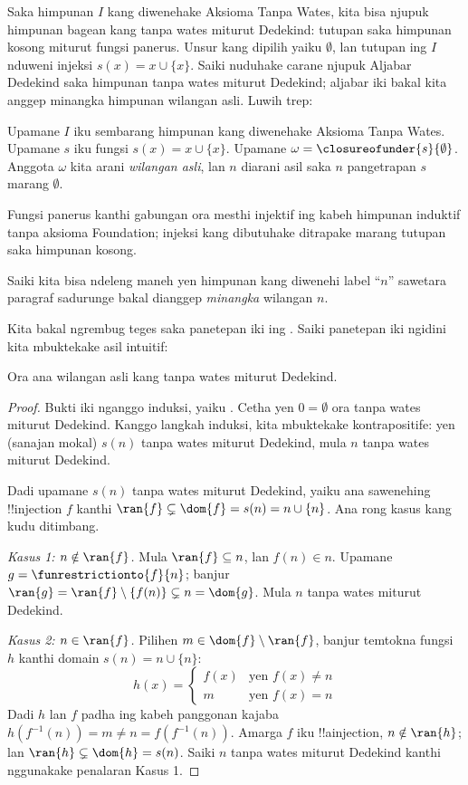 \documentclass[../../../include/open-logic-section]{subfiles}
\begin{document}
Saka himpunan $I$ kang diwenehake Aksioma Tanpa Wates,
kita bisa njupuk himpunan bagean kang tanpa wates miturut
Dedekind: tutupan saka himpunan kosong miturut fungsi panerus.
Unsur kang dipilih yaiku $\emptyset$, lan tutupan ing
$I$ nduweni injeksi $s(x) = x\cup \{x\}$.
Saiki 
nuduhake carane njupuk Aljabar Dedekind saka himpunan
tanpa wates miturut Dedekind; aljabar iki bakal kita
anggep minangka himpunan wilangan asli. Luwih trep:
\begin{defn}
Upamane $I$ iku sembarang himpunan kang diwenehake Aksioma
Tanpa Wates. Upamane $s$ iku fungsi $s(x) = x \cup \{x\}$.
Upamane $\omega = \closureofunder{s}{\emptyset}$. Anggota
$\omega$ kita arani \emph{wilangan asli}, lan $n$ diarani
asil saka $n$ pangetrapan $s$ marang $\emptyset$.
\end{defn}
Fungsi panerus kanthi gabungan ora mesthi injektif ing kabeh himpunan induktif tanpa aksioma Foundation; injeksi kang dibutuhake ditrapake marang tutupan saka himpunan kosong.

Saiki kita bisa ndeleng maneh yen himpunan kang diwenehi
label ``$n$'' sawetara paragraf sadurunge bakal dianggep
\emph{minangka} wilangan $n$.

Kita bakal ngrembug teges saka panetepan iki ing
. Saiki panetepan iki ngidini
kita mbuktekake asil intuitif:

\begin{prop}
Ora ana wilangan asli kang tanpa wates miturut Dedekind.
\end{prop}

\begin{proof}
Bukti iki nganggo induksi, yaiku
.
Cetha yen $0 = \emptyset$ ora tanpa wates miturut Dedekind.
Kanggo langkah induksi, kita mbuktekake kontrapositife:
yen (sanajan mokal) $s(n)$ tanpa wates miturut Dedekind,
mula $n$ tanpa wates miturut Dedekind.

Dadi upamane $s(n)$ tanpa wates miturut Dedekind,
yaiku ana sawenehing !!{injection} $f$ kanthi
$\ran{f}\subsetneq \dom{f} = s(n) = n \cup \{n\}$.
Ana rong kasus kang kudu ditimbang.

\emph{Kasus 1: $n \notin \ran{f}$.} Mula
$\ran{f} \subseteq n$, lan $f(n) \in n$.
Upamane $g = \funrestrictionto{f}{n}$; banjur
$\ran{g} = \ran{f} \setminus \{f(n)\} \subsetneq n = \dom{g}$.
Mula $n$ tanpa wates miturut Dedekind.

\emph{Kasus 2: $n \in \ran{f}$.} Pilihen
$m \in \dom{f} \setminus \ran{f}$, banjur temtokna
fungsi $h$ kanthi domain $s(n) = n \cup \{n\}$:
\[
h(x) = 
	\begin{cases}
		f(x) & \text{yen }f(x) \neq n\\
		m & \text{yen }f(x)=n
	\end{cases}
\]
Dadi $h$ lan $f$ padha ing kabeh panggonan kajaba
$h(f^{-1}(n)) = m \neq n = f(f^{-1}(n))$.
Amarga $f$ iku !!a{injection}, $n \notin \ran{h}$;
lan $\ran{h} \subsetneq \dom{h} = s(n)$. Saiki $n$
tanpa wates miturut Dedekind kanthi nggunakake
penalaran Kasus 1.
\end{proof}
\end{document}
